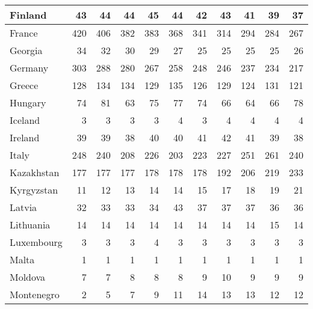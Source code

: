 \begin{table}
\begin{tabular}{|l|r|r|r|r|r|r|r|r|r|r|}
                       Finland&     43&     44&     44&     45&     44&     42&     43&     41&     39&     37\\\hline
                        France&    420&    406&    382&    383&    368&    341&    314&    294&    284&    267\\\hline
                       Georgia&     34&     32&     30&     29&     27&     25&     25&     25&     25&     26\\\hline
                       Germany&    303&    288&    280&    267&    258&    248&    246&    237&    234&    217\\\hline
                        Greece&    128&    134&    134&    129&    135&    126&    129&    124&    131&    121\\\hline
                       Hungary&     74&     81&     63&     75&     77&     74&     66&     64&     66&     78\\\hline
                       Iceland&      3&      3&      3&      3&      4&      3&      4&      4&      4&      4\\\hline
                       Ireland&     39&     39&     38&     40&     40&     41&     42&     41&     39&     38\\\hline
                         Italy&    248&    240&    208&    226&    203&    223&    227&    251&    261&    240\\\hline
                    Kazakhstan&    177&    177&    177&    178&    178&    178&    192&    206&    219&    233\\\hline
                    Kyrgyzstan&     11&     12&     13&     14&     14&     15&     17&     18&     19&     21\\\hline
                        Latvia&     32&     33&     33&     34&     43&     37&     37&     37&     36&     36\\\hline
                     Lithuania&     14&     14&     14&     14&     14&     14&     14&     14&     15&     14\\\hline
                    Luxembourg&      3&      3&      3&      4&      3&      3&      3&      3&      3&      3\\\hline
                         Malta&      1&      1&      1&      1&      1&      1&      1&      1&      1&      1\\\hline
                       Moldova&      7&      7&      8&      8&      8&      9&     10&      9&      9&      9\\\hline
                    Montenegro&      2&      5&      7&      9&     11&     14&     13&     13&     12&     12\\\hline

\end{tabular}
\end{table}
